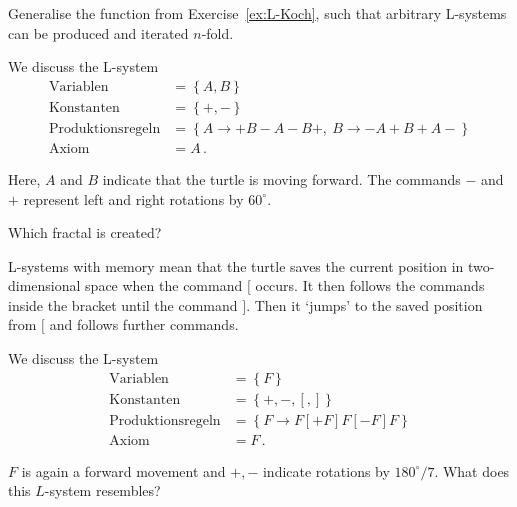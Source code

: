 \subexercise[
    topic = General L-Systems
]
\label{ex:L-allg}

Generalise the function from Exercise~\ref{ex:L-Koch}, such that arbitrary L-systems can be produced and iterated $n$-fold.


\exercise[
    topic = Creating Fractals
]


We discuss the  L-system
\begin{subequations}
    \label{eq:Sierpinski-L}
\begin{align}
    \mathrm{Variablen} &= \left\{A,B\right\} \\
    \mathrm{Konstanten} &= \left\{+,-\right\} \\
    \mathrm{Produktionsregeln} &= \left\{A\rightarrow +B-A-B+,\
        B\rightarrow -A+B+A-\right\} \\
    \mathrm{Axiom} &= A\,.
\end{align}
\end{subequations}

Here, $A$ and $B$ indicate that the turtle is moving forward. The commands $-$ and $+$ represent left and right rotations by  $60^\circ$.

Which fractal is created?

\subexercise[  
topic = Optional: L-Systems with Memory
]

L-systems with memory mean that the turtle saves the current position in two-dimensional space when the command $[$ occurs. It then follows the commands inside the bracket until the command $]$. Then it `jumps' to the saved position from $[$ and follows further commands. 

We discuss the L-system 
\begin{subequations}
    \label{eq:Farn-L}
\begin{align}
    \mathrm{Variablen} &= \left\{F\right\} \\
    \mathrm{Konstanten} &= \left\{+,-,[,]\right\} \\
    \mathrm{Produktionsregeln} &= \left\{ F \rightarrow
        F[+F]F[-F]F\right\}\\
\mathrm{Axiom} &= F\,.
\end{align}
\end{subequations}

$F$ is again a forward movement and $+,-$ indicate rotations by $180^\circ/7$. What does this $L$-system resembles? 
